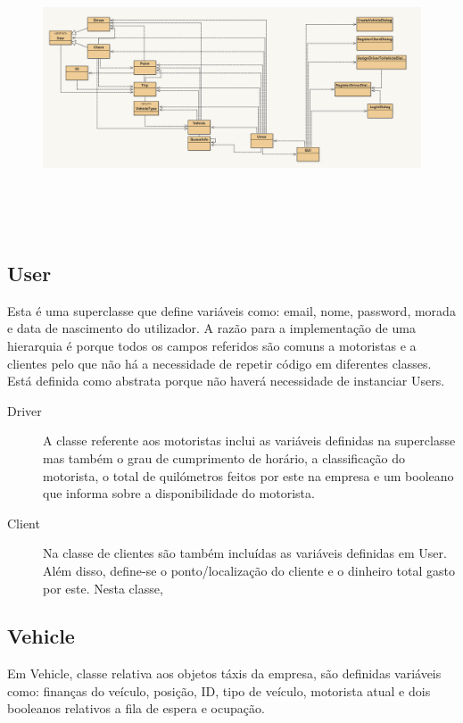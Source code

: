 \documentclass[a4paper]{article}
\begin{document}
\begin{figure}[htbp]
    \centering
    \includegraphics[width = 420pt, height = 240pt]{bluej}
\end{figure}

\pagebreak

\subsection{User}
Esta é uma superclasse que define variáveis como: email, nome, password, morada e data de nascimento do utilizador. A razão para a implementação de uma hierarquia é porque todos os campos referidos são comuns a motoristas e a clientes pelo que não há a necessidade de repetir código em diferentes classes. Está definida como abstrata porque não haverá necessidade de instanciar Users.

\begin{description}
    \item[Driver] A classe referente aos motoristas inclui as variáveis definidas na superclasse mas também o grau de cumprimento de horário, a classificação do motorista, o total de quilómetros feitos por este na empresa e um booleano que informa sobre a disponibilidade do motorista.

    \item[Client] Na classe de clientes são também incluídas as variáveis definidas em User. Além disso, define-se o ponto/localização do cliente e o dinheiro total gasto por este. Nesta classe,

\end{description}

\subsection{Vehicle}
Em Vehicle, classe relativa aos objetos táxis da empresa, são definidas variáveis como: finanças do veículo, posição, ID, tipo de veículo, motorista atual e dois booleanos relativos a fila de espera e ocupação.
\end{document}
